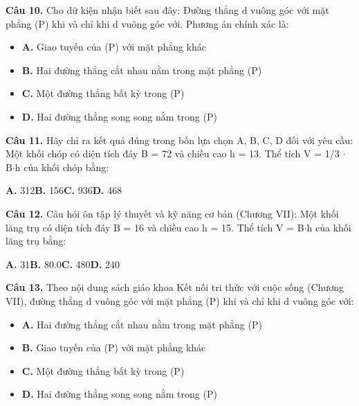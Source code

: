 \documentclass[11pt,a4paper]{article}
\begin{document}
\textbf{\color{primary} Câu 10.} Cho dữ kiện nhận biết sau đây: Đường thẳng d vuông góc với mặt phẳng (P) khi và chỉ khi d vuông góc với. Phương án chính xác là:\par
\begin{itemize}\setlength{\itemsep}{1pt}\setlength{\parskip}{0pt}
  \item[] \textbf{A.} Giao tuyến của (P) với mặt phẳng khác
  \item[] \textbf{B.} Hai đường thẳng cắt nhau nằm trong mặt phẳng (P)
  \item[] \textbf{C.} Một đường thẳng bất kỳ trong (P)
  \item[] \textbf{D.} Hai đường thẳng song song nằm trong (P)
\end{itemize}\vspace{2pt}
\textbf{\color{primary} Câu 11.} Hãy chỉ ra kết quả đúng trong bốn lựa chọn A, B, C, D đối với yêu cầu: Một khối chóp có diện tích đáy B = 72 và chiều cao h = 13. Thể tích V = 1/3 $\cdot$ B$\cdot$h của khối chóp bằng:\par
\hspace*{1.5em}\textbf{A.} 312\quad\quad \textbf{B.} 156\quad\quad \textbf{C.} 936\quad\quad \textbf{D.} 468\par\vspace{2pt}
\textbf{\color{primary} Câu 12.} Câu hỏi ôn tập lý thuyết và kỹ năng cơ bản (Chương VII): Một khối lăng trụ có diện tích đáy B = 16 và chiều cao h = 15. Thể tích V = B$\cdot$h của khối lăng trụ bằng:\par
\hspace*{1.5em}\textbf{A.} 31\quad\quad \textbf{B.} 80.0\quad\quad \textbf{C.} 480\quad\quad \textbf{D.} 240\par\vspace{2pt}
\textbf{\color{primary} Câu 13.} Theo nội dung sách giáo khoa Kết nối tri thức với cuộc sống (Chương VII), đường thẳng d vuông góc với mặt phẳng (P) khi và chỉ khi d vuông góc với:\par
\begin{itemize}\setlength{\itemsep}{1pt}\setlength{\parskip}{0pt}
  \item[] \textbf{A.} Hai đường thẳng cắt nhau nằm trong mặt phẳng (P)
  \item[] \textbf{B.} Giao tuyến của (P) với mặt phẳng khác
  \item[] \textbf{C.} Một đường thẳng bất kỳ trong (P)
  \item[] \textbf{D.} Hai đường thẳng song song nằm trong (P)
\end{itemize}\vspace{2pt}
\end{document}
